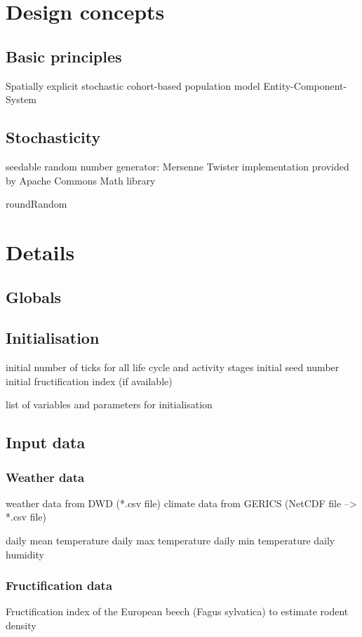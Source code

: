 \documentclass[a4paper, 11pt]{scrartcl}
\begin{document}
\section{Design concepts}

\subsection{Basic principles}
Spatially explicit stochastic cohort-based population model
Entity-Component-System


\subsection{Stochasticity}
seedable random number generator: 
Mersenne Twister implementation 
provided by Apache Commons Math library

roundRandom


\section{Details}

\subsection{Globals}


\subsection{Initialisation}
initial number of ticks for all life cycle and activity stages 
initial seed number
initial fructification index (if available)

list of variables and parameters for initialisation


\subsection{Input data}

\subsubsection{Weather data}
weather data from DWD (*.csv file)
climate data from GERICS (NetCDF file --> *.csv file) 

daily mean temperature
daily max temperature
daily min temperature
daily humidity


\subsubsection{Fructification data}
Fructification index of the European beech (Fagus sylvatica)
to estimate rodent density
\end{document}
